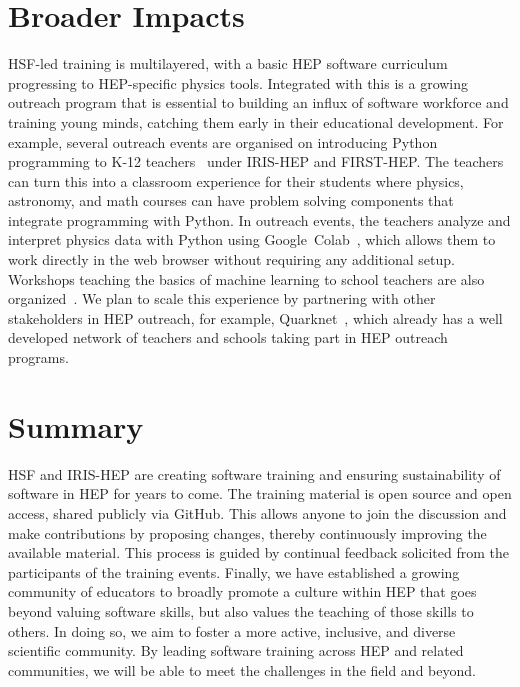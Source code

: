 \documentclass[twocolumn]{svjour3}          %
\begin{document}
\section{Broader Impacts}\label{sec:BroaderImpacts}

HSF-led training is multilayered, with a basic HEP software curriculum progressing to HEP-specific physics tools. Integrated with this is a growing outreach program that is essential to building an influx of software workforce and training young minds, catching them early in their educational development. For example, several outreach events are organised on introducing Python programming to K-12 teachers~\cite{HSF-training-DA-STEM-PR-2020} under IRIS-HEP and FIRST-HEP. The teachers can turn this into a classroom experience for their students where physics, astronomy, and math courses can have problem solving components that integrate programming with Python. In outreach events, the teachers analyze and interpret physics data with Python using Google~Colab~\cite{google-colab}, which allows them to work directly in the web browser without requiring any additional setup. Workshops teaching the basics of machine learning to school teachers are also organized~\cite{HSF-training-ML-STEM-PR-2021}. We plan to scale this experience by partnering with other stakeholders in HEP outreach, for example, Quarknet~\cite{quarknet}, which already has a well developed network of teachers and schools taking part in HEP outreach programs.

\section{Summary}\label{sec:Summary}

HSF and IRIS-HEP are creating software training and ensuring sustainability of software in HEP for years to come. The training material is open source and open access, shared publicly via GitHub. This allows anyone to join the discussion and make contributions by proposing changes, thereby continuously improving the available material.
This process is guided by continual feedback solicited from the participants of the training events. Finally, we have established a growing community of educators to broadly promote a culture within HEP that goes beyond valuing software skills, but also values the teaching of those skills to others. In doing so, we aim to foster a more active, inclusive, and diverse scientific community.  By leading software training across HEP and related communities, we will be able to meet the challenges in the field and beyond.
\end{document}

